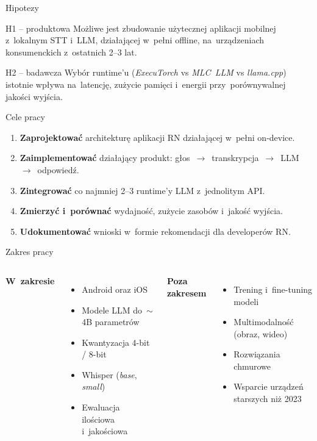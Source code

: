 \documentclass[aspectratio=169,11pt]{beamer}
\begin{document}
\begin{frame}{Hipotezy}
  \begin{block}{H1 -- produktowa}
    Możliwe jest zbudowanie użytecznej aplikacji mobilnej z~lokalnym STT i~LLM, działającej w~pełni offline, na~urządzeniach konsumenckich z~ostatnich 2--3 lat.
  \end{block}
  \vspace{0.5em}
  \begin{block}{H2 -- badawcza}
    Wybór runtime'u (\textit{ExecuTorch} vs \textit{MLC~LLM} vs \textit{llama.cpp}) istotnie wpływa na~latencję, zużycie pamięci i~energii przy~porównywalnej jakości wyjścia.
  \end{block}
\end{frame}

\begin{frame}{Cele pracy}
  \begin{enumerate}
    \item \textbf{Zaprojektować} architekturę aplikacji RN działającej w~pełni on-device.
    \item \textbf{Zaimplementować} działający produkt: głos~$\to$~transkrypcja~$\to$~LLM~$\to$~odpowiedź.
    \item \textbf{Zintegrować} co najmniej 2--3 runtime'y LLM z~jednolitym API.
    \item \textbf{Zmierzyć i~porównać} wydajność, zużycie zasobów i~jakość wyjścia.
    \item \textbf{Udokumentować} wnioski w~formie rekomendacji dla developerów RN.
  \end{enumerate}
\end{frame}

\begin{frame}{Zakres pracy}
  \begin{columns}[T,onlytextwidth]
    \textbf{W~zakresie}
    \begin{itemize}
      \item Android oraz iOS
      \item Modele LLM do~$\sim$4B parametrów
      \item Kwantyzacja 4-bit / 8-bit
      \item Whisper (\textit{base}, \textit{small})
      \item Ewaluacja ilościowa i~jakościowa
    \end{itemize}

    \textbf{Poza zakresem}
    \begin{itemize}
      \item Trening i~fine-tuning modeli
      \item Multimodalność (obraz, wideo)
      \item Rozwiązania chmurowe
      \item Wsparcie urządzeń starszych niż 2023
    \end{itemize}
  \end{columns}
\end{frame}
\end{document}
